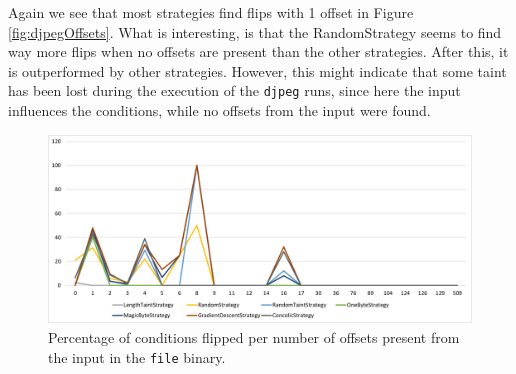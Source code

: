 Again we see that most strategies find flips with 1 offset in Figure \ref{fig:djpegOffsets}. What is interesting, is that the RandomStrategy seems to find way more flips when no offsets are present than the other strategies. After this, it is outperformed by other strategies. However, this might indicate that some taint has been lost during the execution of the \texttt{djpeg} runs, since here the input influences the conditions, while no offsets from the input were found.
\begin{figure}[H]
    \centering
    \includegraphics[width=.8\linewidth]{5_results/graphs/file-offsets.png}  
    \caption{Percentage of conditions flipped per number of offsets present from the input in the \texttt{file} binary.}
    \label{fig:fileOffsets}
\end{figure}

